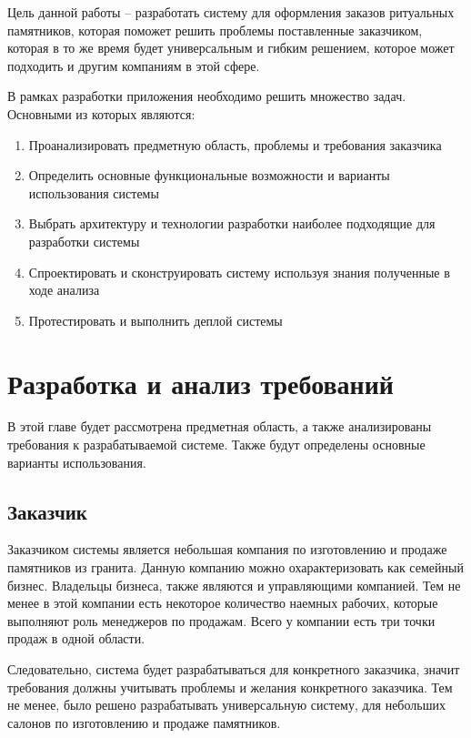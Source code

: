 \documentclass[a4paper,article,14pt]{extarticle}
\begin{document}
Цель данной работы – разработать систему для оформления заказов ритуальных памятников,
которая поможет решить проблемы поставленные заказчиком, которая в то же время будет универсальным и гибким решением, которое может
подходить и другим компаниям в этой сфере.
\pagebreak


В рамках разработки приложения необходимо решить множество задач. Основными из которых являются:

\begin{enumerate}
    \item Проанализировать предметную область, проблемы и требования заказчика
    \item Определить основные функциональные возможности и варианты использования системы
    \item Выбрать архитектуру и технологии разработки наиболее подходящие для разработки системы
    \item Спроектировать и сконструировать систему используя знания полученные в ходе анализа
    \item Протестировать и выполнить деплой системы
\end{enumerate}


\section{Разработка и анализ требований}

В этой главе будет рассмотрена предметная область, а также анализированы требования к разрабатываемой системе.
Также будут определены основные варианты использования.

\subsection{Заказчик}
Заказчиком системы является небольшая компания по изготовлению и продаже памятников из гранита. 
Данную компанию можно охарактеризовать как семейный бизнес.
Владельцы бизнеса, также являются и управляющими компанией. 
Тем не менее в этой компании есть некоторое количество наемных рабочих, которые выполняют роль менеджеров по продажам.
Всего у компании есть три точки продаж в одной области.

Следовательно, система будет разрабатываться для конкретного заказчика, значит требования должны учитывать проблемы и желания
конкретного заказчика. Тем не менее, было решено разрабатывать универсальную систему, для небольших салонов по изготовлению
 и продаже памятников.
\end{document}
